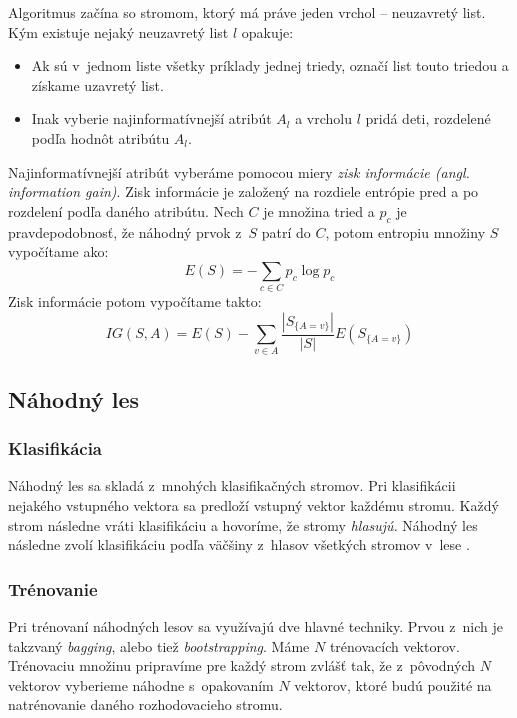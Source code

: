 Algoritmus začína so stromom, ktorý má práve jeden vrchol -- neuzavretý list. Kým existuje nejaký neuzavretý list $l$ opakuje:
\begin{itemize}
    \item Ak sú v~jednom liste všetky príklady jednej triedy, označí list touto triedou a získame uzavretý list.
    \item Inak vyberie najinformatívnejší atribút $A_l$ a vrcholu $l$ pridá deti, rozdelené podľa hodnôt atribútu $A_l$.
\end{itemize}

Najinformatívnejší atribút vyberáme pomocou miery \textit{zisk informácie (angl. information gain)}. Zisk informácie je založený na rozdiele entrópie pred a po rozdelení podľa daného atribútu. Nech $C$ je množina tried a $p_c$ je pravdepodobnosť, že náhodný prvok z~$S$ patrí do $C$, potom entropiu množiny $S$ vypočítame ako:
$$E(S) = -\sum_{c \in C} p_c\log{p_c}$$
Zisk informácie potom vypočítame takto:
$$IG(S,A) = E(S) - \sum_{v \in A} \frac{\left| S_{\{A=v\}} \right|}{\left| S \right|} E\left(S_{\{A=v\}}\right)$$

\subsection{Náhodný les}

\subsubsection{Klasifikácia}
Náhodný les sa skladá z~mnohých klasifikačných stromov. Pri klasifikácii nejakého vstupného vektora sa predloží vstupný vektor každému stromu. Každý strom následne vráti klasifikáciu a hovoríme, že stromy \textit{hlasujú}. Náhodný les následne zvolí klasifikáciu podľa väčšiny z~hlasov všetkých stromov v~lese \cite{randomForest}.


\subsubsection{Trénovanie}

Pri trénovaní náhodných lesov sa využívajú dve hlavné techniky. Prvou z~nich je takzvaný \textit{bagging}, alebo tiež \textit{bootstrapping}. Máme $N$ trénovacích vektorov. Trénovaciu množinu pripravíme pre každý strom zvlášť tak, že z~pôvodných $N$ vektorov vyberieme náhodne s~opakovaním $N$ vektorov, ktoré budú použité na natrénovanie daného rozhodovacieho stromu.

